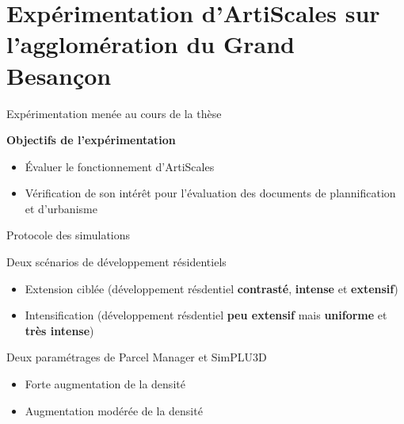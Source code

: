 \documentclass[xcolor=table]{beamer}
\begin{document}
\section[Expérimentation]{Expérimentation d'ArtiScales sur l'agglomération du Grand Besançon}





\begin{frame}{Expérimentation menée au cours de la thèse}
	\begin{block}
		\textbf{Objectifs de l'expérimentation}\\
		\begin{itemize}
			\item Évaluer le fonctionnement d'ArtiScales
			\item Vérification de son intérêt pour l'évaluation des documents de plannification et d'urbanisme
		\end{itemize}
	\end{block}
\end{frame}

\begin{frame}{Protocole des simulations}
	\begin{block}{Deux scénarios de développement résidentiels}
		\begin{itemize}
			\item Extension ciblée (développement résdentiel \textbf{contrasté}, \textbf{intense} et \textbf{extensif})
			\item Intensification (développement résdentiel \textbf{peu extensif} mais \textbf{uniforme} et \textbf{très intense})
		\end{itemize}
	\end{block}
	\begin{block}{Deux paramétrages de Parcel Manager et SimPLU3D}
	\begin{itemize}
		\item Forte augmentation de la densité
		\item Augmentation modérée de la densité
	\end{itemize}
\end{block}
\end{frame}
\end{document}
